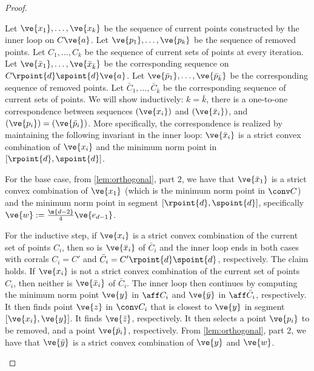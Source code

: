 \begin{proof}
\begin{claimproof}
Let $\ve{x_1}, \dotsc, \ve{x_k}$ be the sequence of current points constructed by the inner loop on $C \ve{a}$. 
Let $\ve{p_1}, \dotsc, \ve{p_k}$ be the sequence of removed points.
Let $C_1, \dotsc, C_k$ be the sequence of current sets of points at every iteration.
Let $\ve{\bar x_1}, \dotsc, \ve{\bar x_{\bar k}}$ be the corresponding sequence on $C \rpoint{d} \spoint{d} \ve{a}$.
Let $\ve{\bar p_1}, \dotsc, \ve{\bar p_{\bar k}}$ be the corresponding sequence of removed points.
Let $\bar C_1, \dotsc, \bar C_{\bar k}$ be the corresponding sequence of current sets of points.
We will show inductively: $k = \bar k$, there is a one-to-one correspondence between sequences $(\ve{x_i})$ and $(\ve{\bar x_i})$, and $(\ve{p_i}) = (\ve{\bar p_i})$.
More specifically, the correspondence is realized by maintaining the following invariant in the inner loop: $\ve{\bar x_i}$ is a strict convex combination of $\ve{x_i}$ and the minimum norm point in $[\rpoint{d}, \spoint{d}]$.

For the base case, from \cref{lem:orthogonal}, part 2, we have that $\ve{\bar x_1}$ is a strict convex combination of $\ve{x_1}$ (which is the minimum norm point in $\conv C$) and the minimum norm point in segment $[\rpoint{d}, \spoint{d}]$, specifically $\ve{w} := \frac{\m{d-2}}{4}\ve{e_{d-1}}$.

For the inductive step, if $\ve{x_i}$ is a strict convex combination of the current set of points $C_i$, then so is $\ve{\bar x_i}$ of $\bar C_i$ and the inner loop ends in both cases with corrals $C_i = C'$ and $\bar C_i = C' \rpoint{d} \spoint{d}$, respectively.
The claim holds.
If $\ve{x_i}$ is not a strict convex combination of the current set of points $C_i$, then neither is $\ve{\bar x_i}$ of $\bar C_i$.
The inner loop then continues by computing the minimum norm point $\ve{y}$ in $\aff C_i$ and $\ve{\bar y}$ in $\aff \bar C_i$, respectively. 
It then finds point $\ve{z}$ in $\conv C_i$ that is closest to $\ve{y}$ in segment $[\ve{x_i}, \ve{y}]$. 
It finds $\ve{\bar z}$, respectively. 
It then selects a point $\ve{p_i}$ to be removed, and a point $\ve{\bar p_i}$, respectively.
From \cref{lem:orthogonal}, part 2, we have that $\ve{\bar y}$ is a strict convex combination of $\ve{y}$ and $\ve{w}$.


\end{claimproof}
\end{proof}
